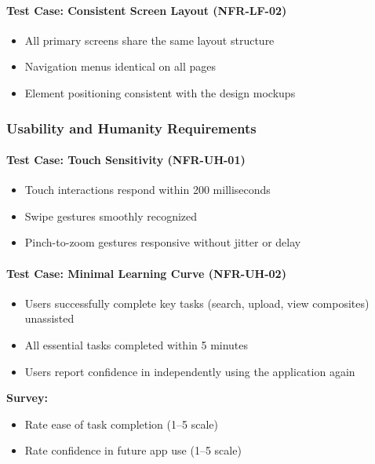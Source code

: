 \documentclass[12pt, titlepage]{article}
\begin{document}
\paragraph{Test Case: Consistent Screen Layout (NFR-LF-02)}
\begin{itemize}
    \item All primary screens share the same layout structure
    \item Navigation menus identical on all pages
    \item Element positioning consistent with the design mockups
\end{itemize}

\subsubsection{Usability and Humanity Requirements}

\paragraph{Test Case: Touch Sensitivity (NFR-UH-01)}
\begin{itemize}
    \item Touch interactions respond within 200 milliseconds
    \item Swipe gestures smoothly recognized
    \item Pinch-to-zoom gestures responsive without jitter or delay
\end{itemize}

\paragraph{Test Case: Minimal Learning Curve (NFR-UH-02)}
\begin{itemize}
    \item Users successfully complete key tasks (search, upload, view composites) unassisted
    \item All essential tasks completed within 5 minutes
    \item Users report confidence in independently using the application again
\end{itemize}
\textbf{Survey:}
\begin{itemize}
    \item Rate ease of task completion (1--5 scale)
    \item Rate confidence in future app use (1--5 scale)
\end{itemize}
\end{document}
